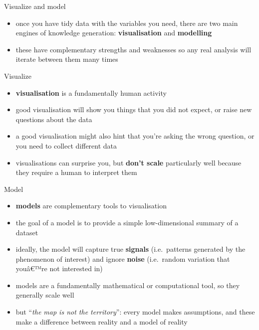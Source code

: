 \documentclass[
  ignorenonframetext,
]{beamer}
\providecommand{\tightlist}{%
  \setlength{\itemsep}{0pt}\setlength{\parskip}{0pt}}
\begin{document}
\begin{frame}{Visualize and model}
\protect\hypertarget{visualize-and-model}{}
\begin{itemize}[<+->]
\tightlist
\item
  once you have tidy data with the variables you need, there are two
  main engines of knowledge generation: \textbf{visualisation} and
  \textbf{modelling}
\item
  these have complementary strengths and weaknesses so any real analysis
  will iterate between them many times
\end{itemize}
\end{frame}

\begin{frame}{Visualize}
\protect\hypertarget{visualize}{}
\begin{itemize}[<+->]
\tightlist
\item
  \textbf{visualisation} is a fundamentally human activity
\item
  good visualisation will show you things that you did not expect, or
  raise new questions about the data
\item
  a good visualisation might also hint that you're asking the wrong
  question, or you need to collect different data
\item
  visualisations can surprise you, but \textbf{don't scale} particularly
  well because they require a human to interpret them
\end{itemize}
\end{frame}

\begin{frame}
\end{frame}

\begin{frame}{Model}
\protect\hypertarget{model}{}
\begin{itemize}[<+->]
\tightlist
\item
  \textbf{models} are complementary tools to visualisation
\item
  the goal of a model is to provide a simple low-dimensional summary of
  a dataset
\item
  ideally, the model will capture true \textbf{signals} (i.e.~patterns
  generated by the phenomenon of interest) and ignore \textbf{noise}
  (i.e.~random variation that youâ€™re not interested in)
\item
  models are a fundamentally mathematical or computational tool, so they
  generally scale well
\item
  but ``\emph{the map is not the territory}'': every model makes
  assumptions, and these make a difference between reality and a model
  of reality
\end{itemize}
\end{frame}
\end{document}
